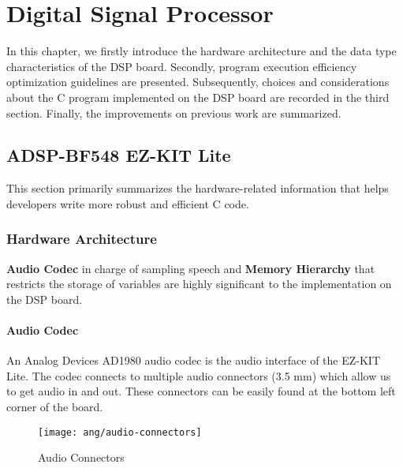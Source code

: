 \chapter{Digital Signal Processor}
\label{chapter:dsp}

In this chapter, we firstly introduce the hardware architecture and the data type characteristics of the DSP board. Secondly, program execution efficiency optimization guidelines are presented. Subsequently, choices and considerations about the C program implemented on the DSP board are recorded in the third section. Finally, the improvements on previous work are summarized.


\section{ADSP-BF548 EZ-KIT Lite}

This section primarily summarizes the hardware-related information that helps developers write more robust and efficient C code.


\subsection{Hardware Architecture}

\textbf{Audio Codec} in charge of sampling speech and \textbf{Memory Hierarchy} that restricts the storage of variables are highly significant to the implementation on the DSP board.


\subsubsection{Audio Codec}
An Analog Devices AD1980 audio codec is the audio interface of the EZ-KIT Lite. The codec connects to multiple audio connectors (3.5 mm) which allow us to get audio in and out. These connectors can be easily found at the bottom left corner of the board.

\begin{figure}[H]
\centering
\texttt{[image: ang/audio-connectors]}
\caption{Audio Connectors}
\label{audio-connectors}
\end{figure}

